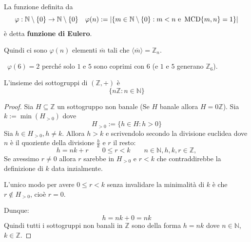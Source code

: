 \documentclass[../main.tex]{subfiles}
\begin{document}
\begin{definition}
    La funzione definita da
    \[
        \varphi : \mathbb{N} \setminus \{0\} \rightarrow \mathbb{N} \setminus \{0\} \quad \varphi(n) := \left|\{m \in \mathbb{N} \setminus \{0\} : m < n \text{ e } \operatorname{MCD} \{m,n\} = 1\}\right|
    \]
    è detta \textbf{funzione di Eulero}.

    Quindi ci sono $\varphi(n)$ elementi $\overline{m}$ tali che $\langle \overline{m} \rangle = \mathbb{Z}_n$.
\end{definition}

\begin{example}\
    $\varphi(6) = 2$ perché solo $1$ e $5$ sono coprimi con $6$ (e $1$ e $5$ generano $\mathbb{Z}_6$).
\end{example}

\begin{proposition}
    L'insieme dei sottogruppi di $(\mathbb{Z} ,+)$ è
    \[
        \boxed{
            \{n \mathbb{Z} : n \in \mathbb{N} \}
        }
    \]
\end{proposition}

\begin{proof}
    Sia $H \subseteq \mathbb{Z} $ un sottogruppo non banale (Se $H$ banale allora $H = 0\mathbb{Z}$).
    Sia $k := \min (H_{>0})$ dove
    \[
        H_{>0} := \{h \in H : h > 0\}
    \]
    Sia $h \in H_{>0}, h \neq k$. Allora $h > k$ e scrivendolo secondo la divisione euclidea dove $n$ è il quoziente della divisione $\frac{h}{k}$ e $r$ il resto:
    \[
        h = nk + r \qquad 0 \leq r < k \qquad n \in \mathbb{N}, h,k,r \in \mathbb{Z},
    \]
    Se avessimo $r \neq 0$ allora $r$ sarebbe in $H_{>0}$ e $r < k$ che contraddirebbe la definizione di $k$ data inzialmente.

    L'unico modo per avere $0 \leq r < k$ senza invalidare la minimalità di $k$ è che $r \notin H_{>0}$, cioè $r = 0$.

    Dunque:
    \[
        h = nk + 0 = nk
    \]
    Quindi tutti i sottogruppi non banali in $\mathbb{Z}$ sono della forma $h = nk$ dove $n \in \mathbb{N}$, $k \in \mathbb{Z}$.
\end{proof}
\end{document}
